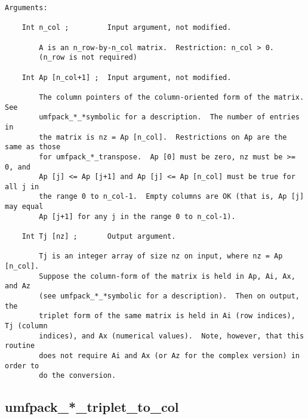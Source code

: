 {\begin{verbatim}
Arguments:

    Int n_col ;         Input argument, not modified.

        A is an n_row-by-n_col matrix.  Restriction: n_col > 0.
        (n_row is not required)

    Int Ap [n_col+1] ;  Input argument, not modified.

        The column pointers of the column-oriented form of the matrix.  See
        umfpack_*_*symbolic for a description.  The number of entries in
        the matrix is nz = Ap [n_col].  Restrictions on Ap are the same as those
        for umfpack_*_transpose.  Ap [0] must be zero, nz must be >= 0, and
        Ap [j] <= Ap [j+1] and Ap [j] <= Ap [n_col] must be true for all j in
        the range 0 to n_col-1.  Empty columns are OK (that is, Ap [j] may equal
        Ap [j+1] for any j in the range 0 to n_col-1).

    Int Tj [nz] ;       Output argument.

        Tj is an integer array of size nz on input, where nz = Ap [n_col].
        Suppose the column-form of the matrix is held in Ap, Ai, Ax, and Az
        (see umfpack_*_*symbolic for a description).  Then on output, the
        triplet form of the same matrix is held in Ai (row indices), Tj (column
        indices), and Ax (numerical values).  Note, however, that this routine
        does not require Ai and Ax (or Az for the complex version) in order to
        do the conversion.
\end{verbatim}
}

\newpage
\subsection{umfpack\_*\_triplet\_to\_col}

